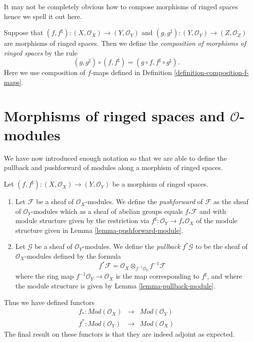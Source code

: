 \noindent
It may not be completely obvious how to compose morphisms of
ringed spaces hence we spell it out here.

\begin{definition}
\label{definition-composition-maps-ringed-spaces}
Suppose that
$(f, f^\sharp) : (X, \mathcal{O}_X) \to (Y, \mathcal{O}_Y)$ and
$(g, g^\sharp) : (Y, \mathcal{O}_Y) \to (Z, \mathcal{O}_Z)$
are morphisms of ringed spaces. Then we define
the {\it composition of morphisms of ringed spaces}
by the rule
$$
(g, g^\sharp) \circ (f, f^\sharp) = (g \circ f, f^\sharp \circ g^\sharp).
$$
Here we use composition of $f$-maps defined in
Definition \ref{definition-composition-f-maps}.
\end{definition}


\section{Morphisms of ringed spaces and $\mathcal{O}$-modules}
\label{section-ringed-spaces-functoriality-modules}

\noindent
We have now introduced enough notation so that we are able to
define the pullback and pushforward of modules along a morphism
of ringed spaces.

\begin{definition}
\label{definition-pushforward}
Let $(f, f^\sharp) : (X, \mathcal{O}_X) \to (Y, \mathcal{O}_Y)$
be a morphism of ringed spaces.
\begin{enumerate}
\item Let $\mathcal{F}$ be a sheaf of $\mathcal{O}_X$-modules.
We define the {\it pushforward} of $\mathcal{F}$ as the
sheaf of $\mathcal{O}_Y$-modules which as a sheaf
of abelian groups equals $f_*\mathcal{F}$ and with
module structure given by the restriction
via $f^\sharp : \mathcal{O}_Y \to f_*\mathcal{O}_X$
of the module structure given
in Lemma \ref{lemma-pushforward-module}.
\item Let $\mathcal{G}$ be a sheaf of $\mathcal{O}_Y$-modules.
We define the {\it pullback} $f^*\mathcal{G}$ to be the
sheaf of $\mathcal{O}_X$-modules defined by the formula
$$
f^*\mathcal{F}
=
\mathcal{O}_X \otimes_{f^{-1}\mathcal{O}_Y} f^{-1}\mathcal{F}
$$
where the ring map $f^{-1}\mathcal{O}_Y \to \mathcal{O}_X$
is the map corresponding to $f^\sharp$, and where the  module
structure is given by Lemma \ref{lemma-pullback-module}.
\end{enumerate}
\end{definition}

\noindent
Thus we have defined functors
\begin{eqnarray*}
f_* : \textit{Mod}(\mathcal{O}_X)
& \longrightarrow &
\textit{Mod}(\mathcal{O}_Y) \\
f^* : \textit{Mod}(\mathcal{O}_Y)
& \longrightarrow &
\textit{Mod}(\mathcal{O}_X)
\end{eqnarray*}
The final result on these functors is that they are indeed
adjoint as expected.

